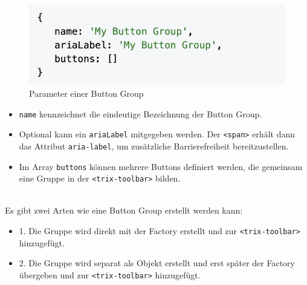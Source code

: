 \begin{figure}[H]
\begin{center}
	\includegraphics[scale=.7]{images/button-group.png}
\end{center}
	\caption{Parameter einer Button Group}
\end{figure}

\begin{itemize}
	\item \texttt{name} kennzeichnet die eindeutige Bezeichnung der Button Group.
	\item Optional kann ein \texttt{ariaLabel} mitgegeben werden. Der \texttt{<span>} erhält dann das Attribut
		\texttt{aria-label}, um zusätzliche Barrierefreiheit bereitzustellen.
	\item Im Array \texttt{buttons} können mehrere Buttons definiert werden, die gemeinsam eine Gruppe in der
		\texttt{<trix-toolbar>} bilden.
\end{itemize}

\mbox{}\\
Es gibt zwei Arten wie eine Button Group erstellt werden kann:

\begin{itemize}
	\item 1. Die Gruppe wird direkt mit der Factory erstellt und zur \texttt{<trix-toolbar>} hinzugefügt.
	\item 2. Die Gruppe wird separat als Objekt erstellt und erst später der Factory übergeben und zur 
		\texttt{<trix-toolbar>} hinzugefügt.
\end{itemize}

